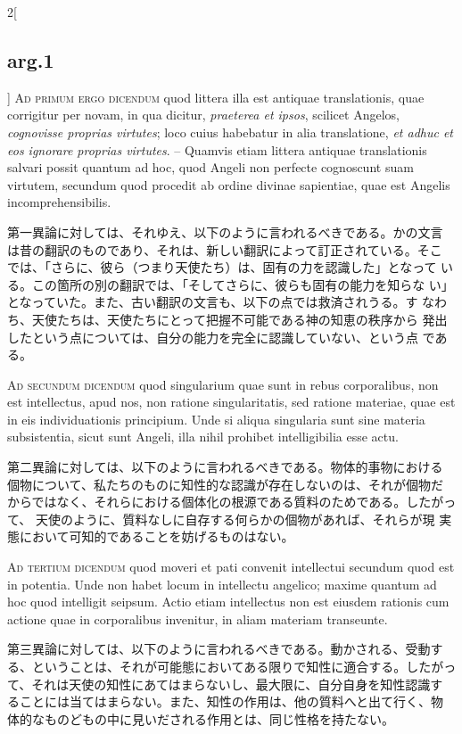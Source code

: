\documentclass[paper=a4paper,fontsize=10pt,jafontsize=9pt,titlepage]{jlreq}
\begin{document}
\begin{paracol}{2}[\subsection{arg.1}]
{\scshape Ad primum ergo dicendum} quod littera illa est antiquae
translationis, quae corrigitur per novam, in qua dicitur, {\itshape
praeterea et ipsos}, scilicet Angelos, {\itshape cognovisse proprias
virtutes}; loco cuius habebatur in alia translatione, {\itshape et
adhuc et eos ignorare proprias virtutes}. -- Quamvis etiam littera
antiquae translationis salvari possit quantum ad hoc, quod Angeli non
perfecte cognoscunt suam virtutem, secundum quod procedit ab ordine
divinae sapientiae, quae est Angelis incomprehensibilis.

\switchcolumn

第一異論に対しては、それゆえ、以下のように言われるべきである。かの文言
は昔の翻訳のものであり、それは、新しい翻訳によって訂正されている。そこ
では、「さらに、彼ら（つまり天使たち）は、固有の力を認識した」となって
いる。この箇所の別の翻訳では、「そしてさらに、彼らも固有の能力を知らな
い」となっていた。また、古い翻訳の文言も、以下の点では救済されうる。す
なわち、天使たちは、天使たちにとって把握不可能である神の知恵の秩序から
発出したという点については、自分の能力を完全に認識していない、という点
である。

\switchcolumn*[\subsection{ad.2}]

{\scshape Ad secundum dicendum} quod singularium quae sunt in rebus
corporalibus, non est intellectus, apud nos, non ratione
singularitatis, sed ratione materiae, quae est in eis individuationis
principium. Unde si aliqua singularia sunt sine materia subsistentia,
sicut sunt Angeli, illa nihil prohibet intelligibilia esse actu.

\switchcolumn

第二異論に対しては、以下のように言われるべきである。物体的事物における
個物について、私たちのものに知性的な認識が存在しないのは、それが個物だ
からではなく、それらにおける個体化の根源である質料のためである。したがっ
て、 天使のように、質料なしに自存する何らかの個物があれば、それらが現
実態において可知的であることを妨げるものはない。

\switchcolumn*[\subsection{ad.3}]

{\scshape Ad tertium dicendum} quod moveri et pati convenit
intellectui secundum quod est in potentia. Unde non habet locum in
intellectu angelico; maxime quantum ad hoc quod intelligit
seipsum. Actio etiam intellectus non est eiusdem rationis cum actione
quae in corporalibus invenitur, in aliam materiam transeunte.

\switchcolumn

第三異論に対しては、以下のように言われるべきである。動かされる、受動す
る、ということは、それが可能態においてある限りで知性に適合する。したがっ
て、それは天使の知性にあてはまらないし、最大限に、自分自身を知性認識す
ることには当てはまらない。また、知性の作用は、他の質料へと出て行く、物
体的なものどもの中に見いだされる作用とは、同じ性格を持たない。

\end{paracol}
\end{document}
